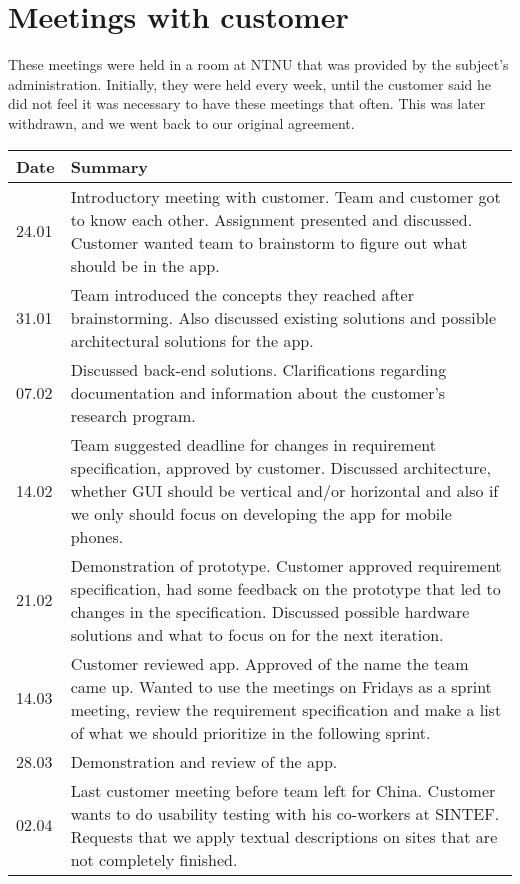 \section{Meetings with customer}
These meetings were held in a room at NTNU that was provided by the subject's administration. Initially, they were held every week, until the customer said he did not feel it was necessary to have these meetings that often. This was later withdrawn, and we went back to our original agreement.
\begin{table}[H]
\centering
\begin{tabular}{|l|p{14.7cm}|}
\hline
\textbf{Date}&\textbf{Summary}\\\hline
24.01& Introductory meeting with customer. Team and customer got to know each other. Assignment presented and discussed. Customer wanted team to brainstorm to figure out what should be in the app.\\\hline
31.01& Team introduced the concepts they reached after brainstorming. Also discussed existing solutions and possible architectural solutions for the app.\\\hline
07.02& Discussed back-end solutions. Clarifications regarding documentation and information about the customer's research program.\\\hline
14.02& Team suggested deadline for changes in requirement specification, approved by customer. Discussed architecture, whether GUI should be vertical and/or horizontal and also if we only should focus on developing the app for mobile phones.\\\hline
21.02&Demonstration of prototype. Customer approved requirement specification, had some feedback on the prototype that led to changes in the specification. Discussed possible hardware solutions and what to focus on for the next iteration. \\\hline
14.03& Customer reviewed app. Approved of the name the team came up. Wanted to use the meetings on Fridays as a sprint meeting, review the requirement specification and make a list of what we should prioritize in the following sprint.\\\hline
28.03& Demonstration and review of the app.\\\hline
02.04& Last customer meeting before team left for China. Customer wants to do usability testing with his co-workers at SINTEF. Requests that we apply textual descriptions on sites that are not completely finished.\\\hline

\end{tabular}
\end{table}
